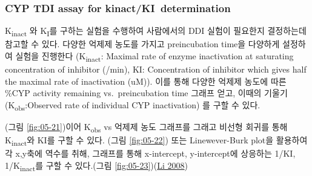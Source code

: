 \documentclass[
  11pt,
  krantz2, a4paper, twoside]{krantz}
\begin{document}
\hypertarget{cyp-tdi-assay-for-kinactki-determination}{%
\subsubsection{CYP TDI assay for kinact/KI~determination}\label{cyp-tdi-assay-for-kinactki-determination}}

K\textsubscript{inact} 와 K\textsubscript{I}를 구하는 실험을 수행하여 사람에서의 DDI 실험이 필요한지
결정하는데 참고할 수 있다. 다양한 억제제 농도를 가지고 preincubation
time을 다양하게 설정하여 실험을 진행한다 (K\textsubscript{inact}: Maximal rate of enzyme
inactivation at saturating concentration of inhibitor (/min), KI:
Concentration of inhibitor which gives half the maximal rate of
inactivation (uM)). 이를 통해 다양한 억제제 농도에 따른 \%CYP activity
remaining vs.~preincubation time 그래프 얻고, 이때의 기울기(K\textsubscript{obs}:Observed rate of individual CYP inactivation) 를 구할 수 있다.

(그림 \ref{fig:05-21})이어 K\textsubscript{obs} vs 억제제 농도 그래프를 그래고 비선형 회귀를 통해 K\textsubscript{inact}와 KI를 구할 수 있다. (그림 \ref{fig:05-22}) 또는 Linewever-Burk plot을 활용하여 각 x,y축에 역수를 취해, 그래프를 통해 x-intercept, y-intercept에 상응하는 1/KI, 1/K\textsubscript{inact}를 구할 수 있다.(그림 \ref{fig:05-23})(\protect\hyperlink{ref-li2008drug}{Li 2008})
\end{document}
